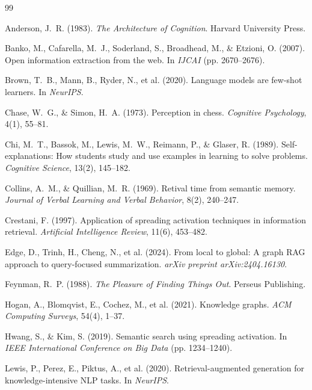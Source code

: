 \documentclass[11pt]{article}
\begin{document}

\begin{thebibliography}{99}

Anderson, J.~R. (1983).
\textit{The Architecture of Cognition}.
Harvard University Press.

Banko, M., Cafarella, M.~J., Soderland, S., Broadhead, M., \& Etzioni, O. (2007).
Open information extraction from the web.
In \textit{IJCAI} (pp. 2670--2676).

Brown, T.~B., Mann, B., Ryder, N., et al. (2020).
Language models are few-shot learners.
In \textit{NeurIPS}.

Chase, W.~G., \& Simon, H.~A. (1973).
Perception in chess.
\textit{Cognitive Psychology}, 4(1), 55--81.

Chi, M.~T., Bassok, M., Lewis, M.~W., Reimann, P., \& Glaser, R. (1989).
Self-explanations: How students study and use examples in learning to solve problems.
\textit{Cognitive Science}, 13(2), 145--182.

Collins, A.~M., \& Quillian, M.~R. (1969).
Retival time from semantic memory.
\textit{Journal of Verbal Learning and Verbal Behavior}, 8(2), 240--247.

Crestani, F. (1997).
Application of spreading activation techniques in information retrieval.
\textit{Artificial Intelligence Review}, 11(6), 453--482.

Edge, D., Trinh, H., Cheng, N., et al. (2024).
From local to global: A graph RAG approach to query-focused summarization.
\textit{arXiv preprint arXiv:2404.16130}.

Feynman, R.~P. (1988).
\textit{The Pleasure of Finding Things Out}.
Perseus Publishing.

Hogan, A., Blomqvist, E., Cochez, M., et al. (2021).
Knowledge graphs.
\textit{ACM Computing Surveys}, 54(4), 1--37.

Hwang, S., \& Kim, S. (2019).
Semantic search using spreading activation.
In \textit{IEEE International Conference on Big Data} (pp. 1234--1240).

Lewis, P., Perez, E., Piktus, A., et al. (2020).
Retrieval-augmented generation for knowledge-intensive NLP tasks.
In \textit{NeurIPS}.


\end{thebibliography}
\end{document}
